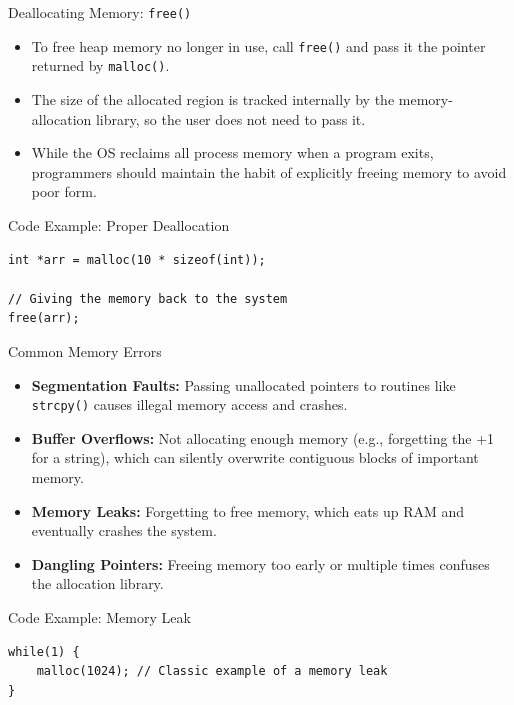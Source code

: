 \documentclass{beamer}
\begin{document}
\begin{frame}[fragile]{Deallocating Memory: \texttt{free()}}
    \begin{itemize}
        \item To free heap memory no longer in use, call \texttt{free()} and pass it the pointer returned by \texttt{malloc()}. %
        \item The size of the allocated region is tracked internally by the memory-allocation library, so the user does not need to pass it. %
        \item While the OS reclaims all process memory when a program exits, programmers should maintain the habit of explicitly freeing memory to avoid poor form. %
    \end{itemize}
    \vspace{0.3cm}
    \begin{block}{Code Example: Proper Deallocation} %
\begin{verbatim}
int *arr = malloc(10 * sizeof(int));

// Giving the memory back to the system
free(arr); 
\end{verbatim}
    \end{block}
\end{frame}

\begin{frame}[fragile]{Common Memory Errors}
    \begin{itemize}
        \item \textbf{Segmentation Faults:} Passing unallocated pointers to routines like \texttt{strcpy()} causes illegal memory access and crashes. %
        \item \textbf{Buffer Overflows:} Not allocating enough memory (e.g., forgetting the +1 for a string), which can silently overwrite contiguous blocks of important memory. %
        \item \textbf{Memory Leaks:} Forgetting to free memory, which eats up RAM and eventually crashes the system. %
        \item \textbf{Dangling Pointers:} Freeing memory too early or multiple times confuses the allocation library. %
    \end{itemize}
    \vspace{0.2cm}
    \begin{block}{Code Example: Memory Leak}
\begin{verbatim}
while(1) { 
    malloc(1024); // Classic example of a memory leak
}
\end{verbatim}
    \end{block}
\end{frame}
\end{document}
